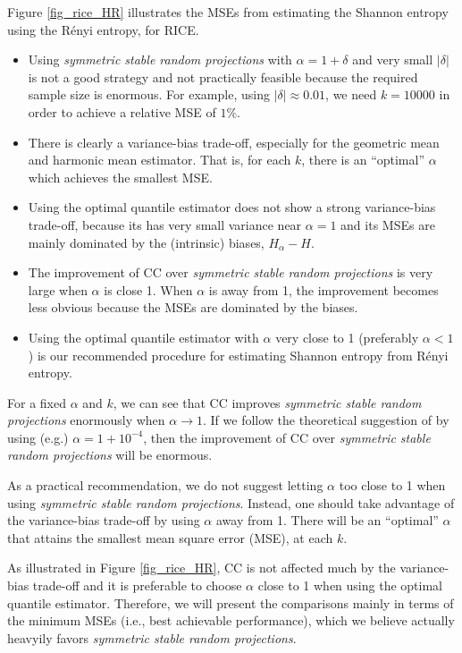 \documentclass{sig-alternate}
\begin{document}
Figure \ref{fig_rice_HR} illustrates the MSEs from estimating the Shannon entropy using the R\'enyi entropy, for RICE.
\begin{itemize}
\item Using {\em symmetric stable random projections} with $\alpha=1+\delta$ and very small $|\delta|$ is not a good strategy and not practically feasible because the required sample size is enormous. For example, using $|\delta|\approx 0.01$, we need $k = 10000$ in order to achieve a relative MSE of $1\%$. 
\item There is clearly a variance-bias trade-off, especially for the geometric mean and harmonic mean estimator.  That is, for each $k$, there is an ``optimal'' $\alpha$ which achieves the smallest MSE.
\item Using the optimal quantile estimator does not show a strong variance-bias trade-off, because its has very small variance near $\alpha=1$ and its MSEs are mainly dominated by the (intrinsic) biases, $H_\alpha - H$.
\item The improvement of CC over {\em symmetric stable random projections} is very large when $\alpha$ is close 1. When $\alpha$ is away from 1, the improvement becomes less obvious because the MSEs are dominated by the biases.
\item
Using the optimal quantile estimator with $\alpha$ very close to 1 (preferably  $\alpha<1$) is our recommended procedure for estimating Shannon entropy from R\'enyi entropy.
\end{itemize}


For a fixed $\alpha$ and $k$, we can see that CC improves {\em symmetric stable random projections} enormously when $\alpha\rightarrow 1$.  If we follow the theoretical suggestion of \cite{Article:Harvey_entropy_arXiv08,Proc:Harvey_FOCS08} by using (e.g.) $\alpha = 1+10^{-4}$, then the improvement of CC over {\em symmetric stable random projections} will be enormous.

As a practical recommendation, we do not suggest letting $\alpha$ too close to 1 when using {\em symmetric stable random projections}. Instead, one should take advantage of the variance-bias trade-off by using $\alpha$ away from 1. There will be an ``optimal'' $\alpha$ that attains the smallest mean square error (MSE), at each $k$. 


As illustrated in  Figure \ref{fig_rice_HR}, CC is not affected much by the variance-bias trade-off and it is preferable to choose $\alpha$  close to 1 when using the optimal quantile estimator. Therefore, we will present the comparisons mainly in terms of the minimum MSEs (i.e., best achievable performance), which we believe actually heavyily favors {\em symmetric stable random projections}.
\end{document}
